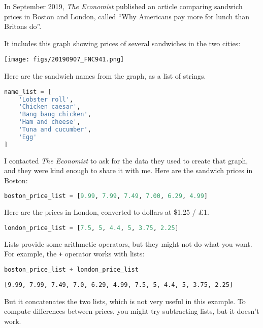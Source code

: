 In September 2019, \emph{The Economist} published an article comparing
sandwich prices in Boston and London, called ``Why Americans pay more
for lunch than Britons do''.

It includes this graph showing prices of several sandwiches in the two
cities:

\texttt{[image: figs/20190907\_FNC941.png]}

\pagebreak

Here are the sandwich names from the graph, as a list of strings.

\begin{lstlisting}[language=Python,style=source]
name_list = [
    'Lobster roll',
    'Chicken caesar',
    'Bang bang chicken',
    'Ham and cheese',
    'Tuna and cucumber',
    'Egg'
]
\end{lstlisting}

I contacted \emph{The Economist} to ask for the data they used to create
that graph, and they were kind enough to share it with me. Here are the
sandwich prices in Boston:

\begin{lstlisting}[language=Python,style=source]
boston_price_list = [9.99, 7.99, 7.49, 7.00, 6.29, 4.99]
\end{lstlisting}

Here are the prices in London, converted to dollars at \$1.25 / £1.

\begin{lstlisting}[language=Python,style=source]
london_price_list = [7.5, 5, 4.4, 5, 3.75, 2.25]
\end{lstlisting}

Lists provide some arithmetic operators, but they might not do what you
want. For example, the \passthrough{\lstinline!+!} operator works with
lists:

\begin{lstlisting}[language=Python,style=source]
boston_price_list + london_price_list
\end{lstlisting}

\begin{lstlisting}[style=output]
[9.99, 7.99, 7.49, 7.0, 6.29, 4.99, 7.5, 5, 4.4, 5, 3.75, 2.25]
\end{lstlisting}

But it concatenates the two lists, which is not very useful in this
example. To compute differences between prices, you might try
subtracting lists, but it doesn't work.

